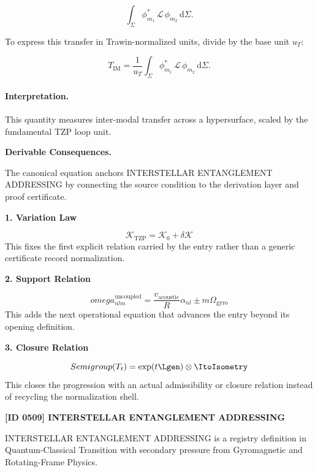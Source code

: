 \begin{equation}
\int_{\Sigma}
\phi_{m_1}^{*}
\,\mathcal{L}\,
\phi_{m_2}
\,\mathrm{d}\Sigma .
\end{equation}

To express this transfer in Trawin-normalized units, divide by the base unit $u_T$:

\begin{equation}
T_{\mathrm{IM}}
=
\frac{1}{u_T}
\int_{\Sigma}
\phi_{m_1}^{*}
\,\mathcal{L}\,
\phi_{m_2}
\,\mathrm{d}\Sigma .
\end{equation}

\paragraph{Interpretation.}
This quantity measures inter-modal transfer across a hypersurface, scaled by the fundamental TZP loop unit.

\par\vspace{0.35em}
\noindent\textbf{Derivable Consequences.}\quad
\begingroup
\footnotesize
\raggedright
The canonical equation anchors INTERSTELLAR ENTANGLEMENT ADDRESSING by connecting the source condition to the derivation layer and proof certificate.
\par\endgroup

\noindent\textbf{1. Variation Law}\par
\[
\mathcal{K}_{\mathrm{TZP}} = \mathcal{K}_0 + \delta \mathcal{K}
\]
\noindent This fixes the first explicit relation carried by the entry rather than a generic certificate record normalization.\par
\noindent\textbf{2. Support Relation}\par
\[
omega_{nlm}^{\text{uncoupled}} = \frac{v_{\text{acoustic}}}{R} \alpha_{nl} \pm m\Omega_{\text{gyro}}
\]
\noindent This adds the next operational equation that advances the entry beyond its opening definition.\par
\noindent\textbf{3. Closure Relation}\par
\[
Semigroup(T_t) = \exp(t \Lgen) \otimes \ItoIsometry
\]
\noindent This closes the progression with an actual admissibility or closure relation instead of recycling the normalization shell.\par

\clearpage
\noindent\textbf{[ID 0509] INTERSTELLAR ENTANGLEMENT ADDRESSING}\par
\vspace{0.35em}
\begingroup\small
{}
INTERSTELLAR ENTANGLEMENT ADDRESSING is a registry definition in Quantum-Classical Transition with secondary pressure from Gyromagnetic and Rotating-Frame Physics.


